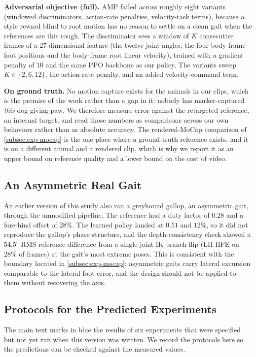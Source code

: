 \textbf{Adversarial objective (full).} AMP failed across roughly eight variants (windowed discriminators, action-rate penalties, velocity-task terms), because a style reward blind to root motion has no reason to settle on a clean gait when the references are this rough. The discriminator sees a window of $K$ consecutive frames of a $27$-dimensional feature (the twelve joint angles, the four body-frame foot positions and the body-frame root linear velocity), trained with a gradient penalty of $10$ and the same PPO backbone as our policy. The variants sweep $K\in\{2,6,12\}$, the action-rate penalty, and an added velocity-command term.

\textbf{On ground truth.} No motion capture exists for the animals in our clips, which is the premise of the work rather than a gap in it: nobody has marker-captured \textit{this} dog giving paw. We therefore measure error against the retargeted reference, an internal target, and read those numbers as comparisons across our own behaviors rather than as absolute accuracy. The rendered-MoCap comparison of \autoref{subsec:exp-mocap} is the one place where a ground-truth reference exists, and it is on a different animal and a rendered clip, which is why we report it as an upper bound on reference quality and a lower bound on the cost of video.

\subsection{An Asymmetric Real Gait}\label{app:gallop}
An earlier version of this study also ran a greyhound gallop, an asymmetric gait, through the unmodified pipeline. The reference had a duty factor of $0.28$ and a fore-hind offset of $28\%$. The learned policy landed at $0.51$ and $12\%$, so it did not reproduce the gallop's phase structure, and the depth-consistency check showed a $54.5^\circ$ RMS reference difference from a single-joint IK branch flip (LH-HFE on $28\%$ of frames) at the gait's most extreme poses. This is consistent with the boundary located in \autoref{subsec:exp-mocap}: asymmetric gaits carry lateral excursion comparable to the lateral foot error, and the design should not be applied to them without recovering the axis.

\subsection{Protocols for the Predicted Experiments}\label{app:protocols}
The main text marks in blue the results of six experiments that were specified but not yet run when this version was written. We record the protocols here so the predictions can be checked against the measured values.

